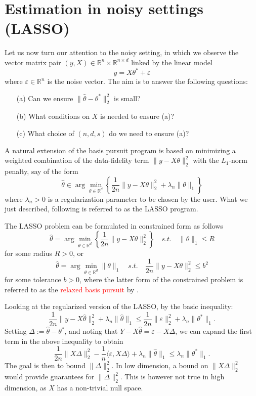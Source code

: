 \documentclass[10pt,handout,english]{beamer}
\newcommand{\R}{\mathbb{R}}
\begin{document}
\section{Estimation in noisy settings (LASSO)}

\begin{frame}[allowframebreaks]
Let us now turn our attention to the noisy setting, in which we observe the vector matrix pair $(y,X)\in\R^{n}\times\R^{n\times d}$ linked by the linear model
\[
y=X\theta^*+\varepsilon
\]
where $\varepsilon\in\R^n$ is the noise vector. The aim is to answer the following questions:
\begin{itemize}
\setlength\itemsep{0.5em}
\item[(a)] Can we ensure $\lVert\hat{\theta}-\theta^*\rVert_2^2$ is small?
\item[(b)] What conditions on $X$ is needed to ensure (a)?
\item[(c)] What choice of $(n,d,s)$ do we need to ensure (a)?
\end{itemize}
 A natural extension of the basis pursuit program is based on minimizing a weighted combination of the data-fidelity term $\lVert y-X\theta\rVert_2^2$ with the $L_1$-norm penalty, say of the form
\[
\hat{\theta}\in\arg\min_{\theta\in\R^d}\left\{\frac{1}{2n}\lVert y-X\theta\rVert_2^2+\lambda_n\lVert\theta\rVert_1\right\}
\] 
where $\lambda_n>0$ is a regularization parameter to be chosen by the user. What we just described, following \citet{tibshirani1996regression} is referred to as the LASSO program.

The LASSO problem can be formulated in constrained form as follows
\[
\hat{\theta}=\arg\min_{\theta\in \R^d}\left\{\frac{1}{2n}\lVert y-X\theta \rVert_2^2\right\}\quad s.t.\quad\lVert\theta\rVert_1\leq R
\]
for some radius $R>0$, or
\[
\hat{\theta}=\arg\min_{\theta\in\R^d}\lVert \theta\rVert_1\quad s.t.\quad \frac{1}{2n}\lVert y-X\theta\rVert_2^2\leq b^2
\]
for some tolerance $b>0$, where the latter form of the constrained problem is referred to as the \textcolor{red}{relaxed basis pursuit} by \citet{}. 

Looking at the regularized version of the LASSO, by the basic inequality:
\[
\frac{1}{2n}\lVert y-X\hat{\theta}\rVert_2^2+\lambda_n\lVert \hat{\theta}\rVert_1\leq \frac{1}{2n}\lVert\varepsilon\rVert_2^2+\lambda_n\lVert\theta^*\rVert_1. 
\]
Setting $\Delta:=\hat{\theta}-\theta^*$, and noting that $Y-X\hat{\theta}=\varepsilon-X\Delta$, we can expand the first 
term in the above inequality to obtain
\[
\frac{1}{2n}\lVert X\Delta\rVert_2^2-\frac{1}{n}\langle \varepsilon,X\Delta\rangle+\lambda_n\lVert\hat{\theta}\rVert_1\leq\lambda_n\lVert\theta^*\rVert_1.
\]
The goal is then to bound $\lVert\Delta\rVert_2^2$. In low dimension, a bound on $\lVert X\Delta\rVert_2^2$ would provide guarantees for $\lVert\Delta\rVert_2^2$. This is however not true in high dimension, as $X$ has a non-trivial null space.
\end{frame}
\end{document}
